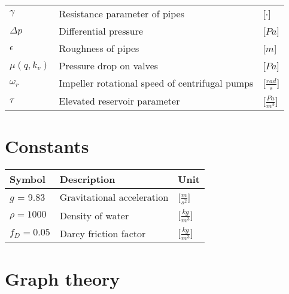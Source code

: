 \begin{tabular}{l l l}
	$\gamma$			&	Resistance parameter of pipes 						& \hspace{25mm}[$\cdot$]\\	
	$\Delta p$			&	Differential pressure 						    	& \hspace{25mm}[$Pa$]\\
	$\epsilon$			&	Roughness of pipes 						    		& \hspace{25mm}[$m$]\\	
	$\mu(q,k_v)$		&	Pressure drop on valves 						   	& \hspace{25mm}[$Pa$]\\
	$\omega_r$			&	Impeller rotational speed of centrifugal pumps 		& \hspace{25mm}[$\frac{rad}{s}$]\\
	$\tau$				&	Elevated reservoir parameter 			 			& \hspace{25mm}[$\frac{Pa}{m^3}$]\\	
\end{tabular}

\section*{Constants}

\begin{tabular}{l l l} 
	\textbf{Symbol}		&	\textbf{Description}							& \hspace{64mm}\textbf{Unit}			\\\hline						
	$g$ = 9.83 			&	Gravitational acceleration						& \hspace{64mm}[$\frac{m}{s^2}$]\\
	$\rho = 1000$		&	Density of water								& \hspace{64mm}[$\frac{kg}{m^3}$]\\
	$f_D = 0.05$			&	Darcy friction factor							& \hspace{64mm}[$\frac{kg}{m^3}$]\\
\end{tabular}

\section*{Graph theory}

